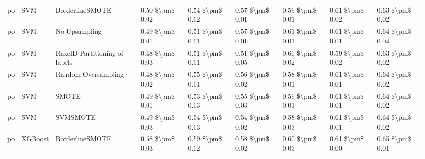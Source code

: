 \begin{tabular}{lllllllll}
      po &                             SVM &               BorderlineSMOTE & 0.50 \$\textbackslash pm\$ 0.02 &           0.54 \$\textbackslash pm\$ 0.02 &       0.57 \$\textbackslash pm\$ 0.01 &        0.59 \$\textbackslash pm\$ 0.01 &                         0.61 \$\textbackslash pm\$ 0.02 &     0.63 \$\textbackslash pm\$ 0.02 \\
      po &                             SVM &                 No Upsampling & 0.49 \$\textbackslash pm\$ 0.01 &           0.51 \$\textbackslash pm\$ 0.01 &       0.57 \$\textbackslash pm\$ 0.01 &        0.61 \$\textbackslash pm\$ 0.01 &                         0.61 \$\textbackslash pm\$ 0.01 &     0.64 \$\textbackslash pm\$ 0.04 \\
      po &                             SVM & RakelD Partitioning of labels & 0.48 \$\textbackslash pm\$ 0.03 &           0.51 \$\textbackslash pm\$ 0.01 &       0.51 \$\textbackslash pm\$ 0.05 &        0.60 \$\textbackslash pm\$ 0.02 &                         0.59 \$\textbackslash pm\$ 0.02 &     0.63 \$\textbackslash pm\$ 0.02 \\
      po &                             SVM &           Random Oversampling & 0.48 \$\textbackslash pm\$ 0.02 &           0.55 \$\textbackslash pm\$ 0.01 &       0.56 \$\textbackslash pm\$ 0.02 &        0.58 \$\textbackslash pm\$ 0.01 &                         0.61 \$\textbackslash pm\$ 0.01 &     0.64 \$\textbackslash pm\$ 0.02 \\
      po &                             SVM &                         SMOTE & 0.49 \$\textbackslash pm\$ 0.01 &           0.53 \$\textbackslash pm\$ 0.03 &       0.55 \$\textbackslash pm\$ 0.03 &        0.59 \$\textbackslash pm\$ 0.01 &                         0.61 \$\textbackslash pm\$ 0.01 &     0.64 \$\textbackslash pm\$ 0.02 \\
      po &                             SVM &                      SVMSMOTE & 0.49 \$\textbackslash pm\$ 0.03 &           0.54 \$\textbackslash pm\$ 0.03 &       0.54 \$\textbackslash pm\$ 0.02 &        0.58 \$\textbackslash pm\$ 0.03 &                         0.61 \$\textbackslash pm\$ 0.01 &     0.64 \$\textbackslash pm\$ 0.02 \\
      po &                         XGBoost &               BorderlineSMOTE & 0.58 \$\textbackslash pm\$ 0.03 &           0.59 \$\textbackslash pm\$ 0.02 &       0.58 \$\textbackslash pm\$ 0.02 &        0.60 \$\textbackslash pm\$ 0.03 &                         0.61 \$\textbackslash pm\$ 0.00 &     0.65 \$\textbackslash pm\$ 0.01 \\

\end{tabular}
